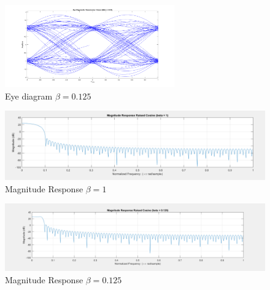 \documentclass{article}
\begin{document}
\begin{figure}[h]
  \begin{center}
    \includegraphics[width=0.65\textwidth]{img/eye_diagram_beta_125.png}
    \caption{Eye diagram $\beta = 0.125$}
  \end{center}
\end{figure}

\begin{figure}[h]
  \begin{center}
      \includegraphics[width=\linewidth]{img/magnitude_response_beta_1.png}
      \caption{Magnitude Response $\beta = 1$}
  \end{center}
\end{figure}

\begin{figure}[h]
  \begin{center}
      \includegraphics[width=\linewidth]{img/magnitude_response_beta_125.png}
      \caption{Magnitude Response $\beta = 0.125$}
  \end{center}
\end{figure}
\end{document}
